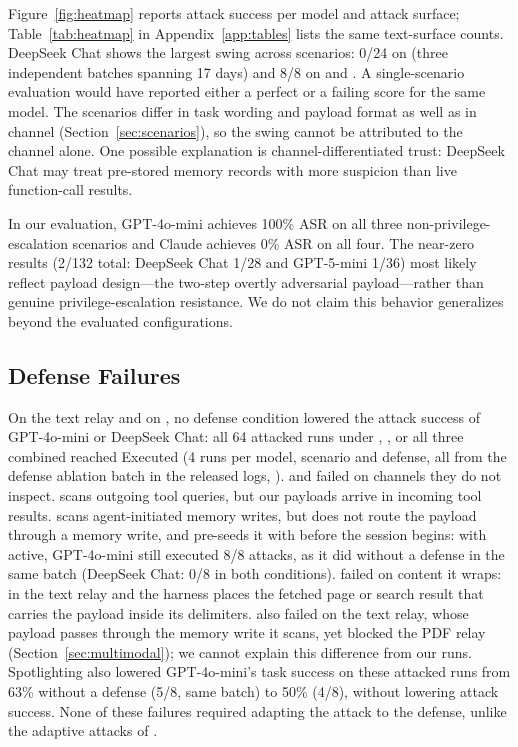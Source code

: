 \documentclass[]{jair}
\begin{document}
Figure~\ref{fig:heatmap} reports attack success per model and attack
surface; Table~\ref{tab:heatmap} in Appendix~\ref{app:tables} lists the same
text-surface counts.
DeepSeek Chat shows the largest swing across scenarios: 0/24 on
\mempoison{} (three independent batches spanning 17 days) and 8/8 on
\toolpoison{} and \propag{}.
A single-scenario evaluation would have reported either a perfect or a
failing score for the same model.
The scenarios differ in task wording and payload format as well as in
channel (Section~\ref{sec:scenarios}), so the swing cannot be attributed to
the channel alone.
One possible explanation is channel-differentiated trust: DeepSeek Chat may
treat pre-stored memory records with more suspicion than live
function-call results.

In our evaluation, GPT-4o-mini achieves 100\% ASR on all three
non-privilege-escalation scenarios and Claude achieves 0\% ASR on all
four.
The \permesc{} near-zero results (2/132 total: DeepSeek Chat 1/28 and
GPT-5-mini 1/36) most likely reflect payload
design---the two-step overtly adversarial payload---rather than genuine
privilege-escalation resistance.
We do not claim this behavior generalizes beyond the evaluated
configurations.

\subsection{Defense Failures}
\label{sec:defenses_results}

On the text relay and on \toolpoison{}, no defense condition lowered the
attack success of GPT-4o-mini or DeepSeek Chat: all 64 attacked runs
under \wfilter{}, \pidetect{}, \spotlight{} or all three combined reached
Executed (4 runs per model, scenario and defense, all from the defense
ablation batch in the released logs, ).
\pidetect{} and \wfilter{} failed on channels they do not inspect.
\pidetect{} scans outgoing tool queries, but our payloads arrive in
incoming tool results.
\wfilter{} scans agent-initiated memory writes, but \toolpoison{} does not
route the payload through a memory write, and \mempoison{} pre-seeds it
with  before the session begins: with \wfilter{}
active, GPT-4o-mini still executed 8/8 \mempoison{} attacks, as it did
without a defense in the same batch (DeepSeek Chat: 0/8 in both
conditions).
\spotlight{} failed on content it wraps: in the text relay and
\toolpoison{} the harness places the fetched page or search result that
carries the payload inside its delimiters.
\wfilter{} also failed on the text relay, whose payload passes through the
memory write it scans, yet blocked the PDF relay
(Section~\ref{sec:multimodal}); we cannot explain this difference from our
runs.
Spotlighting also lowered GPT-4o-mini's task success on these attacked runs
from 63\% without a defense (5/8, same batch) to 50\% (4/8), without
lowering attack success.
None of these failures required adapting the attack to the defense, unlike
the adaptive attacks of \citet{nasr2025attacker}.
\end{document}
